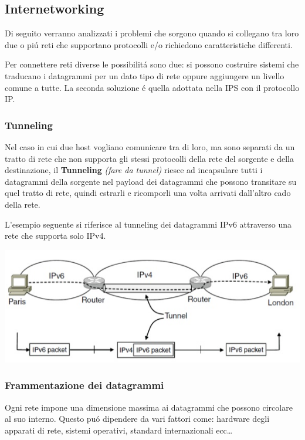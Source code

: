 \documentclass[12pt]{article}
\begin{document}
\subsection{Internetworking}\label{livello-di-rete-internetworking}
Di seguito verranno analizzati i problemi che sorgono quando si collegano tra loro due o pi\'u reti che supportano 
protocolli e/o richiedono caratteristiche differenti.

Per connettere reti diverse le possibilit\'a sono due: si possono costruire sistemi che traducano i datagrammi per un 
dato tipo di rete oppure aggiungere un livello comune a tutte. La seconda soluzione \'e quella adottata nella IPS  con 
il protocollo IP.

\subsubsection{Tunneling}\label{livello-di-rete-internetworking-tunnelling}
Nel caso in cui due host vogliano comunicare tra di loro, ma sono separati da un tratto di rete che non supporta gli 
stessi protocolli della rete del sorgente e della destinazione, il \textbf{Tunneling} \textit{(fare da tunnel)}
riesce ad incapsulare tutti i datagrammi della sorgente nel payload dei datagrammi che possono transitare su quel tratto 
di rete, quindi estrarli e ricomporli una volta arrivati dall'altro cado della rete.

L'esempio seguente si riferisce al tunneling dei datagrammi IPv6 attraverso una rete che supporta solo IPv4.
\begin{center}
	\includegraphics[scale=0.65]{livello_di_rete-img3.png}
\end{center}

\subsubsection{Frammentazione dei datagrammi}\label{livello-di-rete-internetworking-frammentazione}
Ogni rete impone una dimensione massima ai datagrammi che possono circolare al suo interno. Questo pu\'o dipendere da 
vari fattori come: hardware degli apparati di rete, sistemi operativi, standard internazionali ecc\dots
\end{document}
